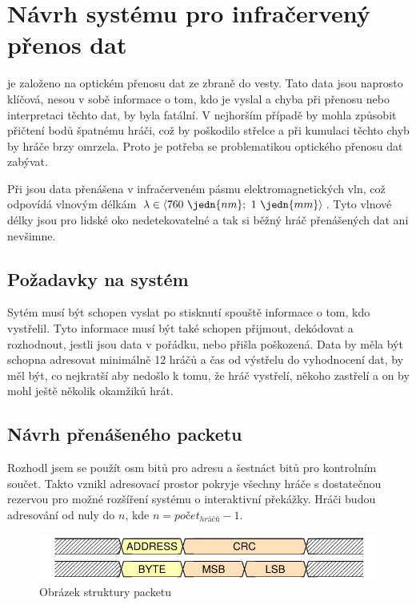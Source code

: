 \chapter{Návrh systému pro infračervený přenos dat}
 je založeno na optickém přenosu dat ze zbraně do vesty. Tato data jsou naprosto klíčová, nesou v sobě informace o tom, kdo je vyslal a chyba při přenosu nebo interpretaci těchto dat, by byla fatální. V nejhorším případě by mohla způsobit přičtení bodů špatnému hráči, což by poškodilo střelce a při kumulaci těchto chyb by  hráče brzy omrzela. Proto je potřeba se problematikou optického přenosu dat zabývat.

Při  jsou data přenášena v infračerveném pásmu elektromagnetických vln, což odpovídá vlnovým délkám $\lambda \in \langle 760~\jedn{nm};~1~\jedn{mm}\rangle$. Tyto vlnové délky jsou pro lidské oko nedetekovatelné a tak si běžný hráč přenášených dat ani nevšimne.

\section{Požadavky na systém}
Sytém musí být schopen vyslat po stisknutí spouště informace o tom, kdo vystřelil. Tyto informace musí být také schopen přijmout, dekódovat a rozhodnout, jestli jsou data v pořádku, nebo přišla poškozená. Data by měla být schopna adresovat minimálně 12 hráčů a čas od výstřelu do vyhodnocení dat, by měl být, co nejkratší aby nedošlo k tomu, že hráč vystřelí, někoho zastřelí a on by mohl ještě několik okamžiků hrát.

\section{Návrh přenášeného packetu}
Rozhodl jsem se použít osm bitů pro adresu a šestnáct bitů pro kontrolním součet. Takto vznikl adresovací prostor pokryje všechny hráče s dostatečnou rezervou pro možné rozšíření systému o interaktivní překážky. Hráči budou adresování od nuly do $n$, kde $n = počet _{hráčů} - 1$.

\begin{figure}[H]
    \begin{center}
        \includegraphics[width=\textwidth]{img/ir-packet}
    \end{center}
    \caption{Obrázek struktury packetu}
\end{figure}


